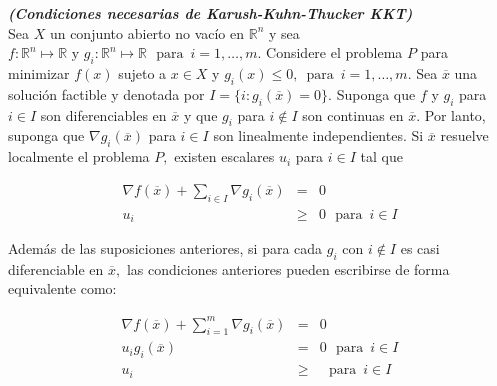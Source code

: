 {\teorema \textbf{\itshape (Condiciones necesarias de Karush-Kuhn-Thucker KKT)}\\
Sea $X$ un conjunto abierto no vac\'io en $\mathbb{R}^n$ y sea $f: \mathbb{R}^n \longmapsto \mathbb{R} \mbox{ y }
g_i: \mathbb{R}^n \longmapsto \mathbb{R}\,\, \mbox{ para }\, i = 1, \ldots , m.$ Considere el problema $P$ para minimizar $f(x)$  sujeto a
$x\in X$ y $g_i(x) \leqslant 0,\,  \mbox{ para }\, i = 1, \ldots , m.$ Sea $\overline{x}$ una soluci\'on factible y denotada por 
$I = \{i: g_i(\overline{x}) = 0\}.$ Suponga que $f$ y $g_i$ para $i \in I$ son diferenciables en $\overline{x}$ y que $g_i$ para $i \notin I$
son continuas en $\overline{x}.$ Por lanto, suponga que $\nabla g_i(\overline{x})$ para $i \in I$ son linealmente independientes. Si 
$\overline{x}$ resuelve localmente el problema $P,$ existen escalares $u_i$ para $i \in I$ tal que 

\begin{eqnarray*}
   \nabla f(\overline{x}) + \displaystyle{\sum_{i \in I} \nabla g_i(\overline{x})} & = & 0\\
   u_i & \geqslant & 0\,\, \mbox{ para } \, i \in I
\end{eqnarray*}

Adem\'as de las suposiciones anteriores, si para cada $g_i$ con $i \notin I$ es casi diferenciable en $\overline{x},$ las condiciones 
anteriores pueden escribirse de forma equivalente como:

\begin{eqnarray*}
   \nabla f(\overline{x}) + \displaystyle{\sum_{i = 1}^{m} \nabla g_i(\overline{x})} & = & 0\\
   u_ig_i(\overline{x})  & = & 0\,\, \mbox{ para } \, i \in I\\
   u_i & \geqslant & \,\, \mbox{ para } \, i \in I
\end{eqnarray*} \label{KKT}}
\medskip




